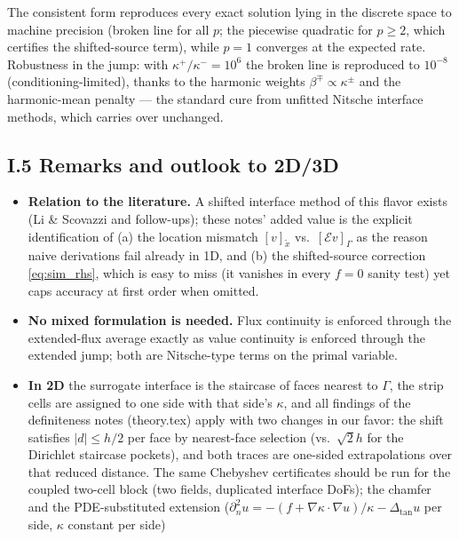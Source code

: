 The consistent form reproduces every exact solution lying in the discrete
space to machine precision (broken line for all $p$; the piecewise
quadratic for $p \ge 2$, which certifies the shifted-source term), while
$p=1$ converges at the expected rate. Robustness in the jump: with
$\kappa^+/\kappa^- = 10^6$ the broken line is reproduced to $10^{-8}$
(conditioning-limited), thanks to the harmonic weights
$\beta^\mp \propto \kappa^\pm$ and the harmonic-mean penalty --- the
standard cure from unfitted Nitsche interface methods, which carries over
unchanged.

\subsection*{I.5 Remarks and outlook to 2D/3D}

\begin{itemize}
  \item \textbf{Relation to the literature.} A shifted interface method
        of this flavor exists (Li \& Scovazzi and follow-ups); these
        notes' added value is the explicit identification of (a) the
        location mismatch $[v]_{\tilde x}$ vs.\ $[\mathcal E v]_\Gamma$ as
        the reason naive derivations fail already in 1D, and (b) the
        shifted-source correction \eqref{eq:sim_rhs}, which is easy to
        miss (it vanishes in every $f=0$ sanity test) yet caps accuracy
        at first order when omitted.
  \item \textbf{No mixed formulation is needed.} Flux continuity is
        enforced through the extended-flux average exactly as value
        continuity is enforced through the extended jump; both are
        Nitsche-type terms on the primal variable.
  \item \textbf{In 2D} the surrogate interface is the staircase of faces
        nearest to $\Gamma$, the strip cells are assigned to one side
        with that side's $\kappa$, and all findings of the definiteness
        notes (theory.tex) apply with two changes in our favor: the
        shift satisfies $|d| \le h/2$ per face by nearest-face selection
        (vs.\ $\sqrt2 h$ for the Dirichlet staircase pockets), and both
        traces are one-sided extrapolations over that reduced distance.
        The same Chebyshev certificates should be run for the coupled
        two-cell block (two fields, duplicated interface DoFs); the
        chamfer and the PDE-substituted extension
        ($\partial_n^2 u = -(f + \nabla\kappa\cdot\nabla u)/\kappa
        - \Delta_{\mathrm{tan}} u$ per side, $\kappa$ constant per side)

\end{itemize}
